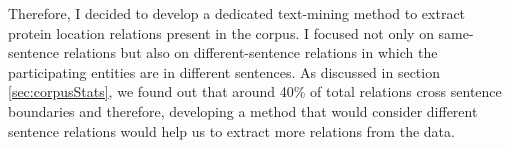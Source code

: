 Therefore, I decided to develop a dedicated text-mining method to extract protein location relations present in the corpus. I focused not only on  same-sentence relations but also on different-sentence relations in which the participating entities are in different sentences. As discussed in section \ref{sec:corpusStats}, we found out that around 40\% of total relations cross sentence boundaries and therefore, developing a method that would consider different sentence relations would help us to extract more relations from the data.




















